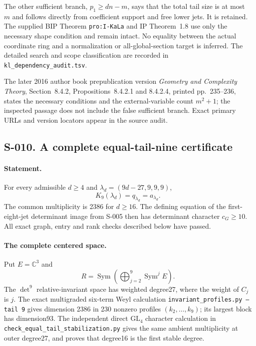 The other sufficient branch, $p_1\geq dn-m$, says that the total
tail size is at most $m$ and follows directly from coefficient
support and free lower jets.  It is retained.  The supplied BIP
Theorem \texttt{pro:I-KaLa} and IP Theorem~1.8 use only the
necessary shape condition and remain intact.  No equality between
the actual coordinate ring and a normalization or all-global-section
target is inferred.  The detailed search and scope classification are
recorded in \texttt{kl\_dependency\_audit.tsv}.

The later 2016 author book prepublication version
\emph{Geometry and Complexity Theory}, Section~8.4.2,
Propositions~8.4.2.1 and 8.4.2.4, printed pp.~235--236, states the
necessary conditions and the external-variable count $m^2+1$;
the inspected passage does not include the false sufficient branch.
Exact primary URLs and version locators appear in the source audit.

\subsection*{S-010. A complete equal-tail-nine certificate}
\paragraph{Statement.}
For
every admissible $d\geq4$ and $\lambda_d=(9d-27,9,9,9)$,
\[
                         K_9(\lambda_d)=q_{\lambda_d}=a_{\lambda_d}.
\]
The common multiplicity is 2386 for $d\geq16$.  The defining equation
of the first-eight-jet determinant image from S-005 then has determinant
character $c_G\geq10$.  All exact graph, entry and rank checks described
below have passed.

\paragraph{The complete centered space.}
Put $E=\mathbb C^3$ and
\[
 R=\operatorname{Sym}\left(\bigoplus_{j=2}^9\operatorname{Sym}^jE\right).
\]
The $\det^9$ relative-invariant space has weighted degree27, where
the weight of $C_j$ is $j$.  The exact multigraded six-term Weyl
calculation \texttt{invariant\_profiles.py --tail 9} gives dimension
2386 in 230 nonzero profiles $(k_2,\ldots,k_9)$; its largest block
has dimension93.  The independent direct $\mathrm{GL}_4$ character
calculation in \texttt{check\_equal\_tail\_stabilization.py} gives
the same ambient multiplicity at outer degree27, and proves that
degree16 is the first stable degree.

